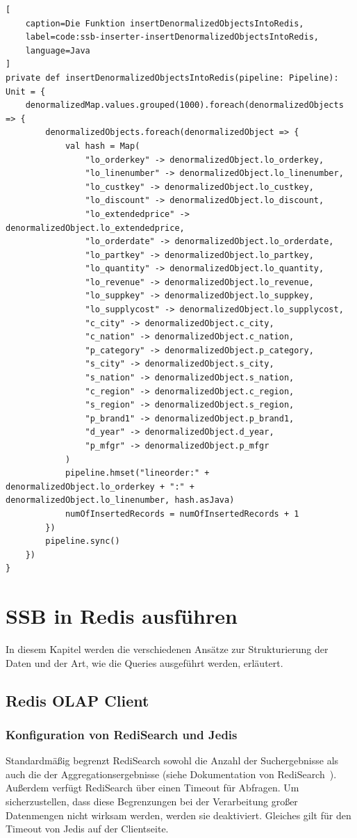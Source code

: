\begin{lstlisting}[
    caption=Die Funktion insertDenormalizedObjectsIntoRedis,
    label=code:ssb-inserter-insertDenormalizedObjectsIntoRedis,
    language=Java
]
private def insertDenormalizedObjectsIntoRedis(pipeline: Pipeline): Unit = {
	denormalizedMap.values.grouped(1000).foreach(denormalizedObjects => {
		denormalizedObjects.foreach(denormalizedObject => {
			val hash = Map(
				"lo_orderkey" -> denormalizedObject.lo_orderkey,
				"lo_linenumber" -> denormalizedObject.lo_linenumber,
				"lo_custkey" -> denormalizedObject.lo_custkey,
				"lo_discount" -> denormalizedObject.lo_discount,
				"lo_extendedprice" -> denormalizedObject.lo_extendedprice,
				"lo_orderdate" -> denormalizedObject.lo_orderdate,
				"lo_partkey" -> denormalizedObject.lo_partkey,
				"lo_quantity" -> denormalizedObject.lo_quantity,
				"lo_revenue" -> denormalizedObject.lo_revenue,
				"lo_suppkey" -> denormalizedObject.lo_suppkey,
				"lo_supplycost" -> denormalizedObject.lo_supplycost,
				"c_city" -> denormalizedObject.c_city,
				"c_nation" -> denormalizedObject.c_nation,
				"p_category" -> denormalizedObject.p_category,
				"s_city" -> denormalizedObject.s_city,
				"s_nation" -> denormalizedObject.s_nation,
				"c_region" -> denormalizedObject.c_region,
				"s_region" -> denormalizedObject.s_region,
				"p_brand1" -> denormalizedObject.p_brand1,
				"d_year" -> denormalizedObject.d_year,
				"p_mfgr" -> denormalizedObject.p_mfgr
			)
			pipeline.hmset("lineorder:" + denormalizedObject.lo_orderkey + ":" + denormalizedObject.lo_linenumber, hash.asJava)
			numOfInsertedRecords = numOfInsertedRecords + 1
		})
		pipeline.sync()
	})
}
\end{lstlisting}



\section{SSB in Redis ausführen}\label{sec:ssb-use-in-redis}
In diesem Kapitel werden die verschiedenen Ansätze zur Strukturierung der Daten und der Art, wie die Queries ausgeführt werden, erläutert.

\subsection{Redis OLAP Client}

\subsubsection{Konfiguration von RediSearch und Jedis}
Standardmäßig begrenzt RediSearch sowohl die Anzahl der Suchergebnisse als auch die der Aggregationsergebnisse (siehe Dokumentation von RediSearch~\cite{redis_ltd_configuration_nodate}). Außerdem verfügt RediSearch über einen Timeout für Abfragen. Um sicherzustellen, dass diese Begrenzungen bei der Verarbeitung großer Datenmengen nicht wirksam werden, werden sie deaktiviert.
Gleiches gilt für den Timeout von Jedis auf der Clientseite.

